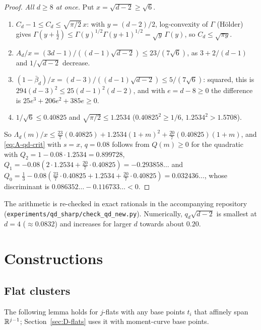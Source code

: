 \documentclass[11pt]{article}
\newcommand{\Abb}{\bar\beta}
\begin{document}
\begin{proof}
\emph{All $d \ge 8$ at once.} Put $x = \sqrt{d-2} \ge \sqrt6$.
\begin{enumerate}[label=(\alph*)]
  \item $C_d - 1 \le C_d \le \sqrt{\pi/2}\, x$: with $y = (d-2)/2$, log-convexity of $\Gamma$
    (H\"older) gives $\Gamma(y + \frac12) \le \Gamma(y)^{1/2}\Gamma(y+1)^{1/2} = \sqrt y\,\Gamma(y)$,
    so $C_d \le \sqrt{\pi y}$.
  \item $A_d/x = (3d-1)/((d-1)\sqrt{d-2}) \le 23/(7\sqrt6)$, as $3 + 2/(d-1)$ and $1/\sqrt{d-2}$
    decrease.
  \item $(1 - \Abb_d)/x = (d-3)/((d-1)\sqrt{d-2}) \le 5/(7\sqrt6)$: squared, this is
    $294(d-3)^2 \le 25(d-1)^2(d-2)$, and with $e = d - 8 \ge 0$ the difference is
    $25e^3 + 206e^2 + 385e \ge 0$.
  \item $1/\sqrt6 \le 0.40825$ and $\sqrt{\pi/2} \le 1.2534$ ($0.40825^2 \ge 1/6$,
    $1.2534^2 > 1.5708$).
\end{enumerate}
So $\Lambda_d(m)/x \le \frac{23}{7}(0.40825) + 1.2534(1+m)^2 + \frac{20}{7}(0.40825)(1+m)$,
and \eqref{eq:A-qd-crit} with $s = x$, $q = 0.08$ follows from $Q(m) \ge 0$ for the quadratic with
$Q_2 = 1 - 0.08 \cdot 1.2534 = 0.899728$, $Q_1 = -0.08(2 \cdot 1.2534 + \frac{20}{7} \cdot 0.40825)
= -0.293858\ldots$ and $Q_0 = \frac13 - 0.08(\frac{23}{7} \cdot 0.40825 + 1.2534 +
\frac{20}{7} \cdot 0.40825) = 0.032436\ldots$, whose discriminant is
$0.086352\ldots - 0.116733\ldots < 0$.
\end{proof}

The arithmetic is re-checked in exact rationals in the accompanying repository
(\nolinkurl{experiments/qd_sharp/check_qd_new.py}). Numerically, $q_d\sqrt{d-2}$ is smallest at
$d = 4$ ($\approx 0.0832$) and increases for larger $d$ towards about $0.20$.

\section{Constructions}\label{sec:upper}

\subsection{Flat clusters}\label{sec:B-lemma2}

The following lemma holds for $j$-flats with any base points $t_i$ that affinely span $\mathbb{R}^{j-1}$;
Section~\ref{sec:D-flats} uses it with moment-curve base points.
\end{document}
